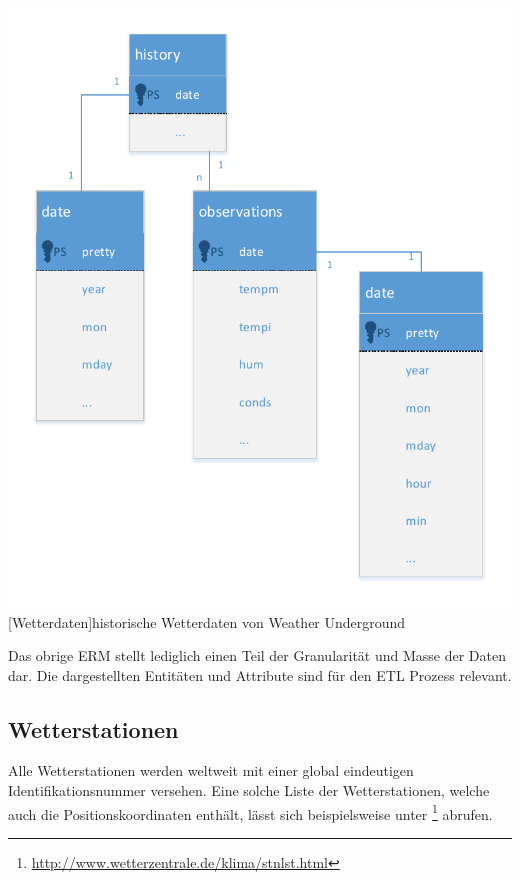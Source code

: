 \documentclass[a4paper,12pt]{scrartcl}
\makeatletter
\def\ScaleIfNeeded{%
\ifdim\Gin@nat@width>\linewidth
\linewidth
\else
\Gin@nat@width
\fi
}
\makeatother
\begin{document}
\begin{center}
\centering
\includegraphics[width=\ScaleIfNeeded]{../Weather.pdf}%
[Wetterdaten]{historische Wetterdaten von Weather Underground}%
\end{center}

Das obrige ERM stellt lediglich einen Teil der Granularität und Masse der Daten dar. Die dargestellten Entitäten und Attribute sind für den ETL Prozess relevant.



\subsection{Wetterstationen}

Alle Wetterstationen werden weltweit mit einer global eindeutigen Identifikationsnummer versehen. Eine solche Liste der Wetterstationen, welche auch die Positionskoordinaten enth\"alt, l\"asst sich beispielsweise unter \footnote{\url{http://www.wetterzentrale.de/klima/stnlst.html}} abrufen.
\end{document}
